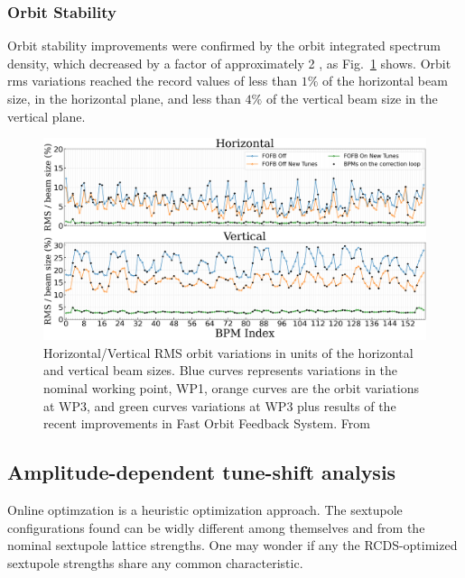 \subsubsection{Orbit Stability}
Orbit stability improvements were confirmed by the orbit integrated spectrum density, which decreased by a factor of approximately 2 \cite{liu_status_2023}, as Fig.~\ref{fig:integrated_spec} shows. Orbit rms variations reached the record values of less than $1\%$ of the horizontal beam size, in the horizontal plane, and less than $4\%$ of the vertical beam size in the vertical plane.


\begin{figure}[tb]
    \centering
    \includegraphics[width=\textwidth]{Images/WEOGA2_f5.png}
    \caption{Horizontal/Vertical RMS orbit variations in units of the horizontal and vertical beam sizes. Blue curves represents variations in the nominal working point, WP1, orange curves are the orbit variations at WP3, and green curves variations at WP3 plus results of the recent improvements in Fast Orbit Feedback System. From~\cite{liu_status_2023}}
    \label{fig:integrated_spec}
\end{figure}

\subsection{Amplitude-dependent tune-shift analysis}
Online optimzation is a heuristic optimization approach. The sextupole configurations found can be widly different among themselves and from the nominal sextupole lattice strengths. One may wonder if any the RCDS-optimized sextupole strengths share any common characteristic.

